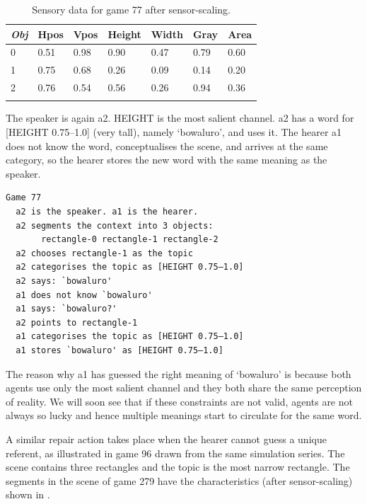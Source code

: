\begin{table}
\begin{center}
\begin{tabular}{ l  l  l  l  l  l  l }
\lsptoprule
{\itshape Obj} & Hpos & Vpos & Height & Width & Gray & Area \\ \midrule
0 & 0.51 & 0.98 & 0.90 & 0.47 & 0.79 & 0.60\\ 
1 & 0.75 & 0.68 & 0.26 & 0.09 & 0.14 & 0.20\\ 
2 & 0.76 & 0.54 & 0.56 & 0.26 & 0.94 & 0.36\\ 
\lspbottomrule
\end{tabular}
\caption{\label{tab:game77}Sensory data for game 77 after sensor-scaling.}
\end{center}
\end{table}
The speaker is again {\bfshape  a2}. HEIGHT is the most salient channel. 
{\bfshape  a2} has a word for [HEIGHT 0.75–1.0] (very tall), namely
`bowaluro', and uses it. The hearer {\bfshape  a1} 
does not know the 
word, conceptualises the scene, and arrives at the 
same category, so the hearer stores the new word
with the same meaning as the speaker. 
\begin{verbatim}
Game 77
  a2 is the speaker. a1 is the hearer. 
  a2 segments the context into 3 objects: 
       rectangle-0 rectangle-1 rectangle-2
  a2 chooses rectangle-1 as the topic 
  a2 categorises the topic as [HEIGHT 0.75–1.0]
  a2 says: `bowaluro'
  a1 does not know `bowaluro'
  a1 says: `bowaluro?'
  a2 points to rectangle-1
  a1 categorises the topic as [HEIGHT 0.75–1.0]
  a1 stores `bowaluro' as [HEIGHT 0.75–1.0]
\end{verbatim}
The reason why {\bfshape  a1} has guessed the right 
meaning of `bowaluro' is because both agents use
only the most salient channel and they both share
the same perception of reality. We will soon see 
that if these constraints are not valid, agents 
are not always so lucky and hence multiple meanings
start to circulate for the same word. 

A similar repair action takes place when the hearer
cannot guess a unique referent, as illustrated in
game 96 drawn from the same simulation series. 
The scene contains three rectangles and the 
topic is the most narrow rectangle. The segments in the scene of game 279
have the characteristics (after sensor-scaling) shown in . 


